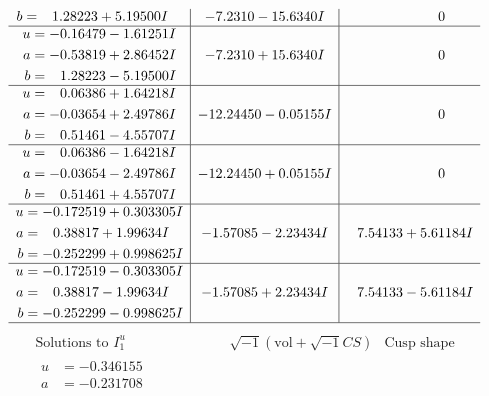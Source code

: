 \documentclass[1p]{elsarticle_modified}
\theoremstyle{definition}
\newcommand{\I}{\sqrt{-1}}
\begin{document}
$$\begin{array}{c|c|c}
\begin{aligned}
b &= \phantom{-}1.28223 + 5.19500 I\end{aligned}
 & -7.2310 - 15.6340 I & \phantom{-0.000000 } 0 \\ \hline\begin{aligned}
u &= -0.16479 - 1.61251 I \\
a &= -0.53819 + 2.86452 I \\
b &= \phantom{-}1.28223 - 5.19500 I\end{aligned}
 & -7.2310 + 15.6340 I & \phantom{-0.000000 } 0 \\ \hline\begin{aligned}
u &= \phantom{-}0.06386 + 1.64218 I \\
a &= -0.03654 + 2.49786 I \\
b &= \phantom{-}0.51461 - 4.55707 I\end{aligned}
 & -12.24450 - 0.05155 I & \phantom{-0.000000 } 0 \\ \hline\begin{aligned}
u &= \phantom{-}0.06386 - 1.64218 I \\
a &= -0.03654 - 2.49786 I \\
b &= \phantom{-}0.51461 + 4.55707 I\end{aligned}
 & -12.24450 + 0.05155 I & \phantom{-0.000000 } 0 \\ \hline\begin{aligned}
u &= -0.172519 + 0.303305 I \\
a &= \phantom{-}0.38817 + 1.99634 I \\
b &= -0.252299 + 0.998625 I\end{aligned}
 & -1.57085 - 2.23434 I & \phantom{-}7.54133 + 5.61184 I \\ \hline\begin{aligned}
u &= -0.172519 - 0.303305 I \\
a &= \phantom{-}0.38817 - 1.99634 I \\
b &= -0.252299 - 0.998625 I\end{aligned}
 & -1.57085 + 2.23434 I & \phantom{-}7.54133 - 5.61184 I\\
 \hline 
 \end{array}$$\newpage$$\begin{array}{c|c|c}  
\text{Solutions to }I^u_{1}& \I (\text{vol} + \sqrt{-1}CS) & \text{Cusp shape}\\
 \hline 
\begin{aligned}
u &= -0.346155\phantom{ +0.000000I} \\
a &= -0.231708\phantom{ +0.000000I} \\

\end{aligned}
\end{array}$$
\end{document}
